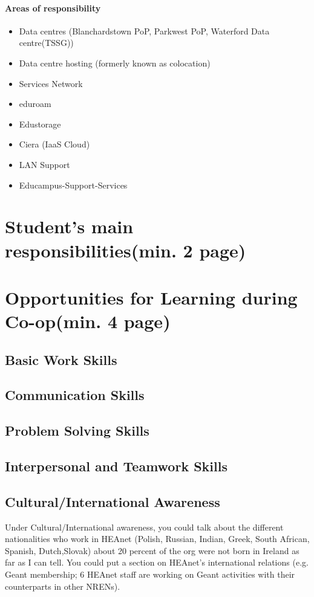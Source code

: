 \documentclass{article}
\begin{document}
\paragraph{Areas of responsibility}
\begin{itemize}
	\item Data centres (Blanchardstown PoP, Parkwest PoP, Waterford Data centre(TSSG))
	\item Data centre hosting (formerly known as colocation) 
	\item Services Network
	\item eduroam
	\item Edustorage
	\item Ciera (IaaS Cloud)
	\item LAN Support
	\item Educampus-Support-Services
\end{itemize}
	
	
\newpage
	
\section{Student's main responsibilities(min. 2 page)}
	
\newpage
	
\section{Opportunities for Learning during Co-op(min. 4 page)}
\subsection{Basic Work Skills}
	
\subsection{Communication Skills}
\subsection{Problem Solving Skills}
\subsection{Interpersonal and Teamwork Skills}
\subsection{Cultural/International Awareness}
Under Cultural/International awareness, you could talk about the different nationalities who work in HEAnet (Polish, Russian, Indian, Greek, South African, Spanish, Dutch,Slovak) about 20 percent of the org were not born in Ireland as far as I can tell. You could put a section on HEAnet's international relations (e.g. Geant membership;  6 HEAnet staff are working on Geant activities with their counterparts in other NRENs). 
\end{document}
